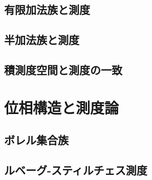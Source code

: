 \documentclass[a4paper, 11pt, report]{ltjsbook}
\begin{document}
\section{有限加法族と測度}

\clearpage

\section{半加法族と測度}

\clearpage

\section{積測度空間と測度の一致}

\clearpage



\chapter{位相構造と測度論}
\section{ボレル集合族}

\clearpage

\section{ルベーグ-スティルチェス測度}

\clearpage
\end{document}
